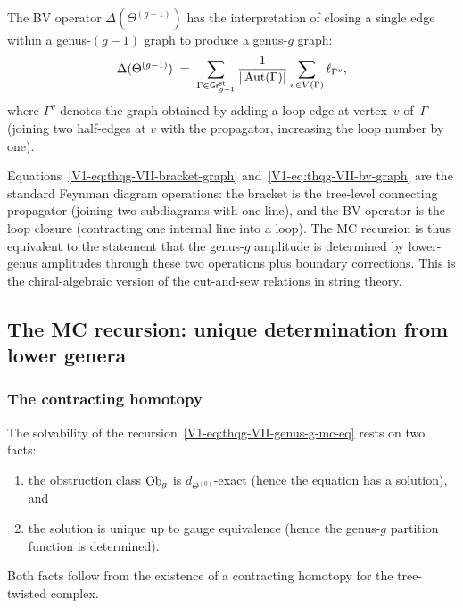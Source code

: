The BV operator $\Delta(\Theta^{(g-1)})$ has the interpretation
of closing a single edge within a genus-$(g{-}1)$ graph to
produce a genus-$g$ graph:
\begin{equation}%
\Delta(\Theta^{(g-1)})
\;=\;
\sum_{\Gamma \in \mathsf{Gr}_{g-1}^{\mathrm{st}}}
\frac{1}{|\Aut(\Gamma)|}
\sum_{v \in V(\Gamma)}
\ell_{\Gamma^v},
\end{equation}
where $\Gamma^v$ denotes the graph obtained by adding a loop edge
at vertex~$v$ of~$\Gamma$ (joining two half-edges at $v$ with
the propagator, increasing the loop number by one).

\begin{remark}
Equations~\eqref{V1-eq:thqg-VII-bracket-graph}
and~\eqref{V1-eq:thqg-VII-bv-graph} are the standard Feynman
diagram operations: the bracket is the tree-level connecting
propagator (joining two subdiagrams with one line), and the BV
operator is the loop closure (contracting one internal line into
a loop). The MC recursion is thus equivalent to the statement
that the genus-$g$ amplitude is determined by lower-genus
amplitudes through these two operations plus boundary corrections.
This is the chiral-algebraic version of the cut-and-sew relations
in string theory.
\end{remark}

%
%

\subsection{The MC recursion: unique determination from lower genera}

\subsubsection{The contracting homotopy}

The solvability of the recursion~\eqref{V1-eq:thqg-VII-genus-g-mc-eq}
rests on two facts:
\begin{enumerate}[label=(\alph*)]
\item the obstruction class $\mathrm{Ob}_g$ is
 $d_{\Theta^{(0)}}$-exact (hence the equation has a
 solution), and
\item the solution is unique up to gauge equivalence
 (hence the genus-$g$ partition function is determined).
\end{enumerate}
Both facts follow from the existence of a contracting homotopy
for the tree-twisted complex.

